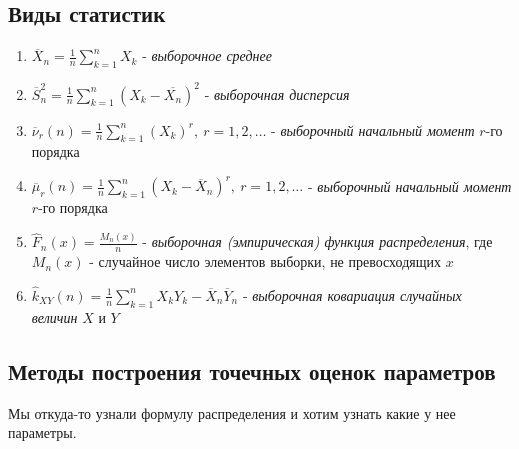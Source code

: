 \documentclass[12pt]{article}
\begin{document}
\subsection{Виды статистик}
\begin{enumerate}
    \itemsep0em
    \item $\overline{X}_{n}=\frac{1}{n}\sum\limits_{k=1}^{n}X_{k}$ -
        \textit{выборочное среднее}
    \item $\overline{S}_{n}^{2}=\frac{1}{n}\sum\limits_{k=1}^{n}(X_{k}
        -\overline{X_{n}})^{2}$ - \textit{выборочная дисперсия}
    \item $\overline{\nu}_{r}(n)=\frac{1}{n}\sum\limits_{k=1}^{n}
        (X_{k})^{r},\ r=1,2,\ldots$ - \textit{выборочный начальный
        момент }$r$-го порядка
    \item $\overline{\mu}_{r}(n)=\frac{1}{n}\sum\limits_{k=1}^{n}
        (X_{k}-\overline{X}_{n})^{r},\ r=1,2,\ldots$ - \textit{выборочный начальный
        момент }$r$-го порядка
    \item $\widehat{F}_{n}(x)=\frac{M_{n}(x)}{n}$ - \textit{выборочная
        (эмпирическая) функция распределения}, где $M_{n}(x)$ -
        случайное число элементов выборки, не превосходящих $x$
    \item $\widehat{k}_{XY}(n)=\frac{1}{n}\sum\limits_{k=1}^{n}
        X_{k}Y_{k}-\overline{X}_{n}\overline{Y}_{n}$ -
        \textit{выборочная ковариация случайных величин } $X$ и $Y$
\end{enumerate}

\subsection{Методы построения точечных оценок параметров}
Мы откуда-то узнали формулу распределения и хотим узнать какие у нее
параметры.
\end{document}
